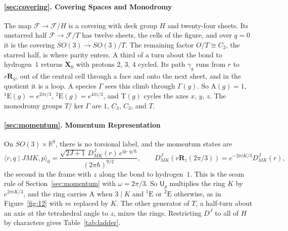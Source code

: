 \documentclass[11pt]{article}
\newcommand{\R}{\mathbb{R}}
\newcommand{\X}{\mathbf{X}}
\newcommand{\Rmat}{\mathbf{R}}
\newcommand{\Uop}{\mathsf{U}}
\begin{document}
\paragraph{\ref{sec:covering}. Covering Spaces and Monodromy}
The map $\mathcal F\to\mathcal F/H$ is a covering
with deck group $H$ and twenty-four sheets. Its unstarred half $\mathcal F\to\mathcal F/T$ has twelve
sheets, the cells of the figure, and over $q=0$ it is the covering $SO(3)\to SO(3)/T$. The remaining factor
$O/T\cong C_2$, the starred half, is where parity enters. A third of a turn about the bond to
hydrogen~$1$ returns $\X_0$ with protons $2$, $3$, $4$ cycled. Its path $\gamma_g$ runs from $r$ to
$r\Rmat_g$, out of the central cell through a face and onto the next sheet, and in the quotient it is a
loop. A species $\Gamma$ sees this climb through $\Gamma(g)$. So $\mathrm A(g)=1$,
${}^1\mathrm E(g)=e^{2\pi i/3}$, ${}^2\mathrm E(g)=e^{4\pi i/3}$, and $\mathrm T(g)$ cycles the axes $x$,
$y$, $z$. The monodromy groups $T/\ker\Gamma$ are $1$, $C_3$, $C_3$, and $T$.

\paragraph{\ref{sec:momentum}. Momentum Representation}
On $SO(3)\times\R^9$, there is no torsional label, and
the momentum states are
\[
\langle r,q\mid JMK,p\rangle_0=\frac{\sqrt{2J+1}\,D^J_{MK}(r)\,e^{ip\cdot q/\hbar}}{(2\pi\hbar)^{9/2}},
\qquad
D^J_{MK}(r\Rmat_z(2\pi/3))=e^{-2\pi iK/3}D^J_{MK}(r),
\]
the second in the frame with $z$ along the bond to hydrogen~$1$. This is the seam rule of
Section~\ref{sec:momentum}
with $\omega=2\pi/3$. So $\Uop_g$ multiplies the ring $K$ by $e^{2\pi iK/3}$, and the ring carries
$\mathrm A$ when $3\mid K$ and ${}^1\mathrm E$ or ${}^2\mathrm E$ otherwise, as in Figure~\ref{fig:12}
with $m$
replaced by $K$. The other generator of $T$, a half-turn about an axis at the tetrahedral angle to $z$,
mixes the rings. Restricting $D^J$ to all of $H$ by characters gives Table~\ref{tab:ladder}.
\end{document}
